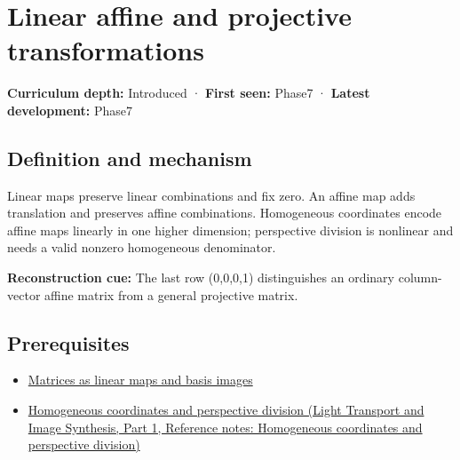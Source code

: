 \hypertarget{appendix-0bf0ca73f735}{}\label{referencestart:appendix-0bf0ca73f735}
\section{Linear affine and projective transformations}\label{appendix-0bf0ca73f735-linear-affine-and-projective-transformations}

\hypertarget{appendix-0bf0ca73f735-linear-affine-and-projective-transformations}{}

\textbf{Curriculum depth:} Introduced · \textbf{First seen:} Phase7 · \textbf{Latest development:} Phase7

\begin{allmightroledefinition}

\subsection{Definition and mechanism}\label{appendix-0bf0ca73f735-definition-and-mechanism}

\hypertarget{appendix-0bf0ca73f735-definition-and-mechanism}{}

Linear maps preserve linear combinations and fix zero. An affine map adds translation and preserves affine combinations. Homogeneous coordinates encode affine maps linearly in one higher dimension; perspective division is nonlinear and needs a valid nonzero homogeneous denominator.

\end{allmightroledefinition}

\textbf{Reconstruction cue:} The last row (0,0,0,1) distinguishes an ordinary column-vector affine matrix from a general projective matrix.

\subsection{Prerequisites}\label{appendix-0bf0ca73f735-prerequisites}

\hypertarget{appendix-0bf0ca73f735-prerequisites}{}

\begin{itemize}
\tightlist
\item
  \hyperref[appendix-bd39c3bf5d64]{Matrices as linear maps and basis images}
\item
  \href{../04-Light-Transport-and-Image-Synthesis-P01/main.pdf\#appendix-cb3b26862282}{Homogeneous coordinates and perspective division (Light Transport and Image Synthesis, Part 1, Reference notes: Homogeneous coordinates and perspective division)}
\end{itemize}

